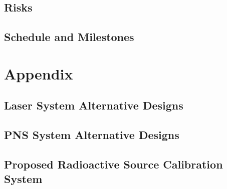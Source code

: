 %

\subsection{Risks}
\label{sec:sp-calib-risks}


\subsection{Schedule and Milestones}
\label{sec:sp-calib-sched}



\newpage

\section{Appendix}
\subsection{Laser System Alternative Designs}
\label{sec:sp-calib-laser-alter}


\subsection{PNS System Alternative Designs}
\label{sec:sp-calib-pns-alter}


\subsection{Proposed Radioactive Source Calibration System}
\label{sec:sp-calib-sys-rsds}


